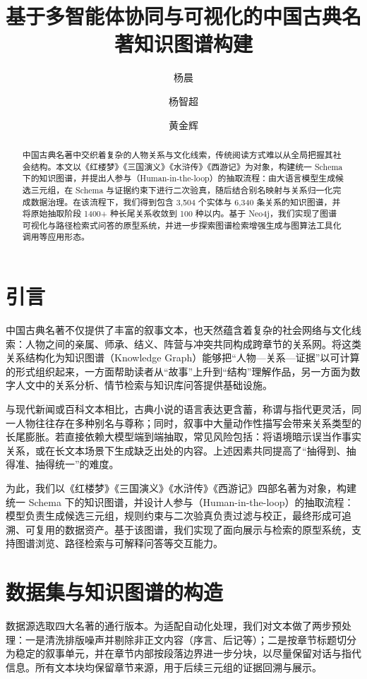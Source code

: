 \documentclass[lang=cn,a4paper,newtx,code=minted]{elegantpaper}
\title{基于多智能体协同与可视化的中国古典名著知识图谱构建}
\author{杨晨 \and 杨智超 \and 黄金辉}
\institute{大数据学院 \quad 应用统计}
\date{\zhdate{2025/12/28}}
\begin{document}
\maketitle

\begin{abstract}
中国古典名著中交织着复杂的人物关系与文化线索，传统阅读方式难以从全局把握其社会结构。本文以《红楼梦》《三国演义》《水浒传》《西游记》为对象，构建统一 Schema 下的知识图谱，并提出人参与（Human-in-the-loop）的抽取流程：由大语言模型生成候选三元组，在 Schema 与证据约束下进行二次验真，随后结合别名映射与关系归一化完成数据治理。在该流程下，我们得到包含 3,504 个实体与 6,340 条关系的知识图谱，并将原始抽取阶段 1400+ 种长尾关系收敛到 100 种以内。基于 Neo4j，我们实现了图谱可视化与路径检索式问答的原型系统，并进一步探索图谱检索增强生成与图算法工具化调用等应用形态。

\end{abstract}

\section{引言}

中国古典名著不仅提供了丰富的叙事文本，也天然蕴含着复杂的社会网络与文化线索：人物之间的亲属、师承、结义、阵营与冲突共同构成跨章节的关系网。将这类关系结构化为知识图谱（Knowledge Graph）能够把“人物—关系—证据”以可计算的形式组织起来，一方面帮助读者从“故事”上升到“结构”理解作品，另一方面为数字人文中的关系分析、情节检索与知识库问答提供基础设施。

与现代新闻或百科文本相比，古典小说的语言表达更含蓄，称谓与指代更灵活，同一人物往往存在多种别名与尊称；同时，叙事中大量动作性描写会带来关系类型的长尾膨胀。若直接依赖大模型端到端抽取，常见风险包括：将语境暗示误当作事实关系，或在长文本场景下生成缺乏出处的内容。上述因素共同提高了“抽得到、抽得准、抽得统一”的难度。

为此，我们以《红楼梦》《三国演义》《水浒传》《西游记》四部名著为对象，构建统一 Schema 下的知识图谱，并设计人参与（Human-in-the-loop）的抽取流程：模型负责生成候选三元组，规则约束与二次验真负责过滤与校正，最终形成可追溯、可复用的数据资产。基于该图谱，我们实现了面向展示与检索的原型系统，支持图谱浏览、路径检索与可解释问答等交互能力。

\section{数据集与知识图谱的构造}

数据源选取四大名著的通行版本。为适配自动化处理，我们对文本做了两步预处理：一是清洗排版噪声并剔除非正文内容（序言、后记等）；二是按章节标题切分为稳定的叙事单元，并在章节内部按段落边界进一步分块，以尽量保留对话与指代信息。所有文本块均保留章节来源，用于后续三元组的证据回溯与展示。
\end{document}
